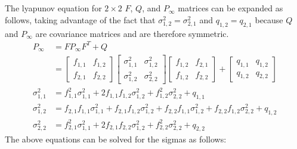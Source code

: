 \documentclass[11pt]{article}
\begin{document}
\subparagraph*{}
The lyapunov equation for $2\times2$ $F$, $Q$, and $P_\infty$ matrices can be expanded as follows, taking advantage of the fact that $\sigma_{1,2}^2=\sigma_{2,1}^2$ and $q_{1,2}=q_{2,1}$ because $Q$ and $P_\infty$ are covariance matrices and are therefore symmetric.
\begin{align*}
	P_\infty &= FP_\infty F^T + Q \\
	&= \begin{bmatrix} f_{1,1}&f_{1,2}\\f_{2,1}&f_{2,2} \end{bmatrix} \begin{bmatrix} \sigma_{1,1}^2 & \sigma_{1,2}^2 \\ \sigma_{1,2}^2 & \sigma_{2,2}^2 \end{bmatrix} \begin{bmatrix} f_{1,2}&f_{2,1}\\f_{1,2}&f_{2,2} \end{bmatrix} + \begin{bmatrix} q_{1,1} & q_{1,2} \\ q_{1,2} & q_{2,2} \end{bmatrix} \\
	\sigma_{1,1}^2 &= f_{1,1}^2\sigma_{1,1}^2+2f_{1,1}f_{1,2}\sigma_{1,2}^2 + f_{1,2}^2\sigma_{2,2}^2 + q_{1,1} \\
	\sigma_{1,2}^2 &= f_{2,1}f_{1,1}\sigma_{1,1}^2+f_{2,1}f_{1,2}\sigma_{1,2}^2+f_{2,2}f_{1,1}\sigma_{1,2}^2+f_{2,2}f_{1,2}\sigma_{2,2}^2 + q_{1,2} \\
	\sigma_{2,2}^2 &= f_{2,1}^2\sigma_{1,1}^2+2f_{2,1}f_{2,2}\sigma_{1,2}^2+f_{2,2}^2\sigma_{2,2}^2 + q_{2,2}
\end{align*}
The above equations can be solved for the sigmas as follows:
\end{document}
